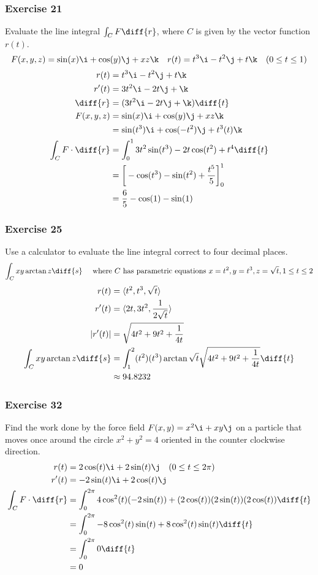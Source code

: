 \documentclass{math}
\begin{document}
\subsubsection*{Exercise 21}
Evaluate the line integral \( \int_{C}F\diff{r} \), where \( C \)
is given by the vector function \( r(t) \).
\[ F(x,y,z) = \sin(x)\i+\cos(y)\j+xz\k \quad r(t) = t^3\i-t^2\j+t\k \quad
  (0\le t\le1) \]
\begin{align*}
  r(t) &= t^3\i-t^2\j+t\k \\
  r'(t) &= 3t^2\i-2t\j+\k \\
  \diff{r} &= (3t^2\i-2t\j+\k)\diff{t} \\
  F(x,y,z) &= \sin(x)\i+\cos(y)\j+xz\k \\
  &= \sin(t^3)\i+\cos(-t^2)\j+t^3(t)\k \\
  \int_{C}F\cdot\diff{r} &= \int_{0}^{1}3t^2\sin(t^3)-2t\cos(t^2)+t^4\diff{t} \\
  &= \bigg[-\cos(t^3)-\sin(t^2)+\frac{t^5}{5}\bigg]_{0}^{1} \\
  &= \frac{6}{5}-\cos(1)-\sin(1)
\end{align*}

\subsubsection*{Exercise 25}
Use a calculator to evaluate the line integral correct to four decimal places.
\[ \int_{C}xy\arctan{z}\diff{s} \quad \text{ where } C \text{ has parametric
equations } x = t^2, y = t^3, z = \sqrt{t}, 1\le t\le 2 \]
\begin{align*}
  r(t) &= \langle t^2,t^3,\sqrt{t}\rangle \\
  r'(t) &= \langle 2t,3t^2,\frac{1}{2\sqrt{t}}\rangle \\
  |r'(t)| &= \sqrt{4t^2+9t^2+\frac{1}{4t}} \\
  \int_{C}xy\arctan{z}\diff{s} &= \int_{1}^{2}(t^2)(t^3)\arctan{\sqrt{t}}
    \sqrt{4t^2+9t^2+\frac{1}{4t}}\diff{t} \\
  &\approx 94.8232
\end{align*}

\subsubsection*{Exercise 32}
Find the work done by the force field \( F(x,y) = x^2\i+xy\j \) on a particle
that moves once around the circle \( x^2+y^2 = 4 \) oriented in the counter
clockwise direction.
\begin{align*}
  r(t) &= 2\cos(t)\i+2\sin(t)\j \quad (0\le t\le 2\pi) \\
  r'(t) &= -2\sin(t)\i+2\cos(t)\j \\
  \int_{C}F\cdot\diff{r} &= \int_{0}^{2\pi}4\cos^2(t)(-2\sin(t))+
    (2\cos(t))(2\sin(t))(2\cos(t))\diff{t} \\
  &= \int_{0}^{2\pi}-8\cos^2(t)\sin(t)+8\cos^2(t)\sin(t)\diff{t} \\
  &= \int_{0}^{2\pi}0\diff{t} \\
  &= 0
\end{align*}
\end{document}
